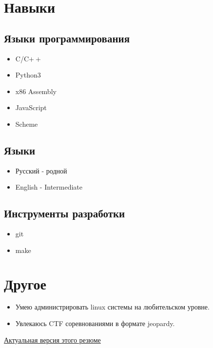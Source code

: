 \documentclass{article}
\begin{document}
    \section{Навыки}
        \begin{multicols}{2}
            \subsection{Языки программирования}
                \begin{itemize}
                    \item C/C$\boldsymbol{++}$
                    \item Python3
                    \item x86 Assembly
                    \item JavaScript
                    \item Scheme
                \end{itemize}
            \subsection{Языки}
                \begin{itemize}
                    \item Русский - родной
                    \item English - Intermediate
                \end{itemize}
            \subsection{Инструменты разработки}
                \begin{itemize}
                    \item git
                    \item make
                \end{itemize}
        \end{multicols}
        
    \section{Другое}
        \begin{itemize}
        \item Умею администрировать linux системы на любительском уровне.
            \item Увлекаюсь CTF соревнованиями в формате jeopardy. 
        \end{itemize}
    \vspace{\fill}
    \begin{center}
        \large
        \href {https://github.com/InversionSpaces/resume}{Актуальная версия этого резюме}
    \end{center}
\end{document}
